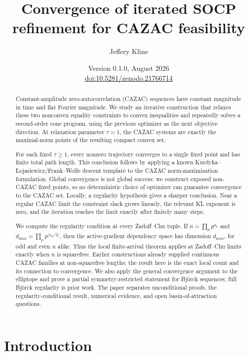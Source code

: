 \documentclass[11pt]{article}
\title{Convergence of iterated SOCP refinement for CAZAC feasibility}
\author{Jeffery Kline}
\date{Version 0.1.0, August 2026\\
\href{https://doi.org/10.5281/zenodo.21766714}{doi:10.5281/zenodo.21766714}}
\theoremstyle{plain}
\theoremstyle{definition}
\theoremstyle{remark}
\begin{document}
\maketitle

\begin{abstract}
Constant-amplitude zero-autocorrelation (CAZAC) sequences have constant
magnitude in time and flat Fourier magnitude.  We study an iterative
construction that relaxes these two nonconvex equality constraints to convex
inequalities and repeatedly solves a second-order cone program, using the
previous optimizer as the next objective direction.  At relaxation parameter
$\tau=1$, the CAZAC systems are exactly the maximal-norm points of the
resulting compact convex set.

For each fixed $\tau\ge1$, every nonzero trajectory converges to a single
fixed point and has finite total path length.  This conclusion follows by
applying a known
Kurdyka--{\L}ojasiewicz/Frank--Wolfe descent template to the CAZAC
norm-maximization formulation.  Global convergence is not global success:
we construct exposed non-CAZAC fixed points, so no deterministic choice of
optimizer can guarantee convergence to the CAZAC set.  Locally, a regularity
hypothesis gives a sharper conclusion.  Near a regular CAZAC limit the
constraint slack grows linearly, the relevant KL exponent is zero, and the
iteration reaches the limit exactly after finitely many steps.

We compute the regularity condition at every Zadoff--Chu tuple.  If
$n=\prod_p p^{a_p}$ and
$d_{\max}=\prod_p p^{\lfloor a_p/2\rfloor}$, then the active-gradient
dependency space has dimension $d_{\max}$, for odd and even $n$ alike.
Thus the local finite-arrival theorem applies at Zadoff--Chu limits exactly
when $n$ is squarefree.  Earlier constructions already supplied continuous
CAZAC families at non-squarefree lengths; the result here is the exact local
count and its connection to convergence.  We also apply the general
convergence argument to the elliptope and prove a partial symmetry-restricted
statement for Bj\"orck sequences; full Bj\"orck regularity is prior work.
The paper separates unconditional proofs, the regularity-conditional result,
numerical evidence, and open basin-of-attraction questions.
\end{abstract}

\section{Introduction}
\end{document}
